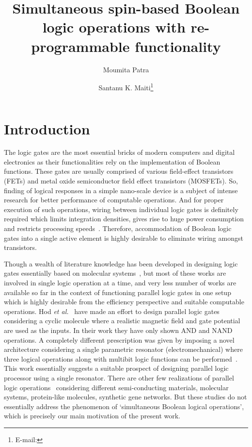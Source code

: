 \documentclass[doublecol]{epl2}
\title{Simultaneous spin-based Boolean logic operations with re-programmable
functionality}
\author{Moumita Patra\inst{1} \and Santanu K. Maiti\inst{1}\thanks{E-mail:
\email{santanu.maiti@isical.ac.in}}}
\institute{
 \inst{1} Physics and Applied Mathematics Unit, Indian Statistical
Institute, 203 Barrackpore Trunk Road, Kolkata-700 108, India
}
\begin{document}
\maketitle

\section{Introduction}

The logic gates are the most essential bricks of modern computers and 
digital electronics as their functionalities rely on the implementation
of Boolean functions. These gates are usually comprised of various
field-effect transistors (FETs) and metal oxide semiconductor field
effect transistors (MOSFETs). So, finding of logical responses in a
simple nano-scale device is a subject of intense research for better
performance of computable operations. And for proper execution of such 
operations, wiring between individual logic gates is definitely required 
which limits integration densities, gives rise to huge power consumption 
and restricts processing speeds~\cite{cite1}. Therefore, accommodation 
of Boolean logic gates into a single active element is highly desirable 
to eliminate wiring amongst transistors.

Though a wealth of literature knowledge has been developed in designing 
logic gates essentially based on molecular systems~\cite{cite2,cite3,cite4}, 
but most of these works are involved in single logic operation at a time, 
and very less number of works are available so far in the context of 
functioning parallel logic gates in one setup which is highly desirable 
from the efficiency perspective and suitable computable operations. 
Hod {\em et al.}~\cite{hod} have made an effort to design parallel logic 
gates considering a cyclic molecule where a realistic magnetic field and 
gate potential are used as the inputs. In their work they have only shown 
AND and NAND operations. A completely different prescription was given by
imposing a novel architecture considering a single parametric resonator
(electromechanical) where three logical operations along with multibit 
logic functions can be performed~\cite{cite1}. This work essentially 
suggests a suitable prospect of designing parallel logic processor using 
a single resonator. There are other few realizations of parallel logic 
operations~\cite{pl1,pl2,pl3,pl4} considering different semi-conducting 
materials, molecular systems, protein-like molecules, synthetic gene 
networks. But these studies do not essentially address the phenomenon of 
`simultaneous Boolean logical operations', which is precisely our main 
motivation of the present work.
\end{document}
